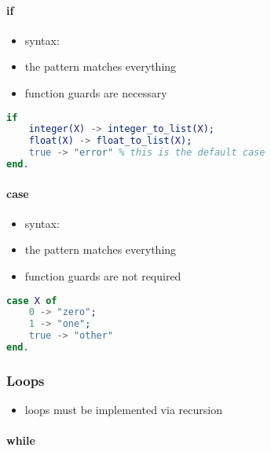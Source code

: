 \documentclass[a4paper,landscape,10pt]{article}
\begin{document}
\begin{multicols*}{2}
  \breakcolumn

  \paragraph{if}

  \begin{itemize}
    \item syntax: 
    \item the  pattern matches everything
    \item function guards are necessary
  \end{itemize}

  \begin{lstlisting}[language=Erlang]
if
    integer(X) -> integer_to_list(X);
    float(X) -> float_to_list(X);
    true -> "error" % this is the default case
end.
  \end{lstlisting}

  \paragraph{case}

  \begin{itemize}
    \item syntax: 
    \item the  pattern matches everything
    \item function guards are not required
  \end{itemize}

  \begin{lstlisting}[language=Erlang]
case X of
    0 -> "zero";
    1 -> "one";
    true -> "other"
end.
  \end{lstlisting}

  \subsubsection{Loops}

  \begin{itemize}
    \item loops must be implemented via recursion
  \end{itemize}

  \paragraph{while}


\end{multicols*}
\end{document}
